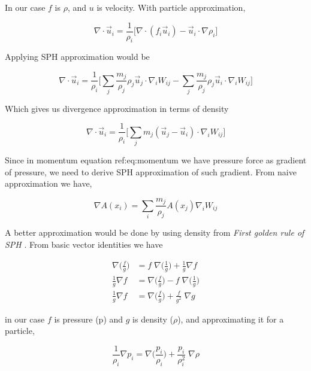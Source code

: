 In our case $f$ is $\rho$, and $u$ is velocity.  With particle
approximation,

\begin{equation*}
  \nabla \cdot \vec{u}_i = \frac{1}{\rho_i}
  \Big[\nabla\cdot(f_i \vec{u}_i) - \vec{u}_i \cdot \nabla{\rho}_i
  \Big]
\end{equation*}

Applying SPH approximation would be

\begin{equation*}
  \nabla \cdot \vec{u}_i = \frac{1}{\rho_i} \Big[
  \sum_j \frac{m_j}{\rho_j} \rho_j \vec{u}_j \cdot \nabla_i W_{ij} - \sum_j
  \frac{m_j}{\rho_j} \rho_j \vec{u}_i \cdot \nabla_i W_{ij} \Big]
\end{equation*}

Which gives us divergence approximation in terms of density

\begin{equation}
  \label{eq:divergence_sph}
  \nabla \cdot \vec{u}_i = \frac{1}{\rho_i}
  \Big[ \sum_j {m_j} (\vec{u}_j - \vec{u}_i) \cdot \nabla_i W_{ij}
  \Big]
\end{equation}


Since in momentum equation ref:eq:momentum we have pressure force as gradient
of pressure, we need to derive SPH approximation of such gradient. From naive
approximation we have,


\begin{equation}
  \label{eq:df_app}
   \nabla A(x_i) = \sum_i \frac{m_j}{\rho_j} A(x_j) \nabla_i W_{ij}
\end{equation}


A better approximation would be done by using density from \textit{First golden rule
of SPH} \cite{monaghan-1992-smoot-partic-hydrod}.  From basic vector identities we
have

\begin{align*}
  \nabla \bigg( \frac{f}{g} \bigg) &= f\; \nabla \bigg(\frac{1}{g} \bigg) + \frac{1}{g} \nabla f \\
  \frac{1}{g} \nabla f &= \nabla \bigg( \frac{f}{g} \bigg) - f\; \nabla \bigg( \frac{1}{g} \bigg) \\
  \frac{1}{g} \nabla f &= \nabla \bigg( \frac{f}{g} \bigg) + \frac{f}{g^2} \; \nabla g
\end{align*}

in our case $f$ is pressure (p) and $g$ is density ($\rho$), and
approximating it for a particle,


\begin{equation*}
  \frac{1}{\rho_i} \nabla p_i = \nabla \big(\frac{p_i}{\rho_i} \big) + \frac{p_i}{\rho_i^2} \; \nabla \rho
\end{equation*}

